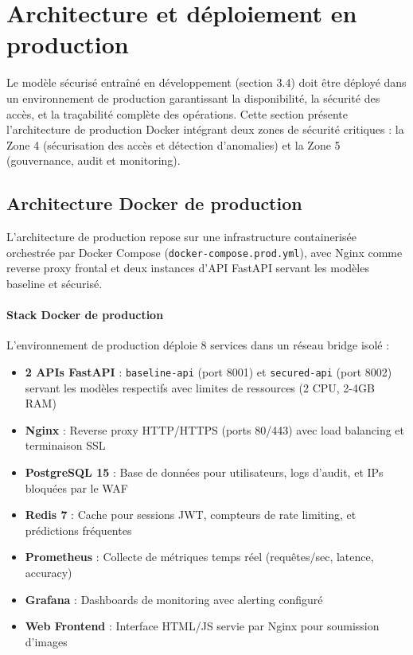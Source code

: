 \section{Architecture et déploiement en production}

Le modèle sécurisé entraîné en développement (section 3.4) doit être déployé dans un environnement de production garantissant la disponibilité, la sécurité des accès, et la traçabilité complète des opérations. Cette section présente l'architecture de production Docker intégrant deux zones de sécurité critiques : la Zone 4 (sécurisation des accès et détection d'anomalies) et la Zone 5 (gouvernance, audit et monitoring).

\subsection{Architecture Docker de production}

L'architecture de production repose sur une infrastructure containerisée orchestrée par Docker Compose (\texttt{docker-compose.prod.yml}), avec Nginx comme reverse proxy frontal et deux instances d'API FastAPI servant les modèles baseline et sécurisé.

\paragraph{Stack Docker de production}

L'environnement de production déploie 8 services dans un réseau bridge isolé :

\begin{itemize}
    \item \textbf{2 APIs FastAPI} : \texttt{baseline-api} (port 8001) et \texttt{secured-api} (port 8002) servant les modèles respectifs avec limites de ressources (2 CPU, 2-4GB RAM)
    \item \textbf{Nginx} : Reverse proxy HTTP/HTTPS (ports 80/443) avec load balancing et terminaison SSL
    \item \textbf{PostgreSQL 15} : Base de données pour utilisateurs, logs d'audit, et IPs bloquées par le WAF
    \item \textbf{Redis 7} : Cache pour sessions JWT, compteurs de rate limiting, et prédictions fréquentes
    \item \textbf{Prometheus} : Collecte de métriques temps réel (requêtes/sec, latence, accuracy)
    \item \textbf{Grafana} : Dashboards de monitoring avec alerting configuré
    \item \textbf{Web Frontend} : Interface HTML/JS servie par Nginx pour soumission d'images
\end{itemize}

